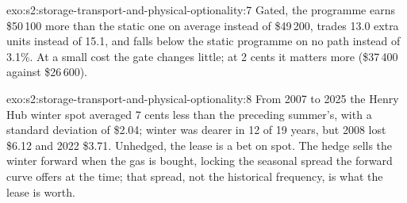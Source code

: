 \begin{solution}{exo:s2:storage-transport-and-physical-optionality:7}
Gated, the programme earns \$50\,100 more than the static one on average instead of \$49\,200, trades 13.0 extra units instead of 15.1, and falls below
the static programme on no path instead of 3.1\%. At a small cost the gate changes little; at 2 cents it matters more (\$37\,400 against \$26\,600).
\end{solution}

\begin{solution}{exo:s2:storage-transport-and-physical-optionality:8}
From 2007 to 2025 the Henry Hub winter spot averaged 7 cents less than the preceding summer's, with a standard deviation of \$2.04; winter was dearer
in 12 of 19 years, but 2008 lost \$6.12 and 2022 \$3.71. Unhedged, the lease is a bet on spot. The hedge sells the winter forward when the gas is
bought, locking the seasonal spread the forward curve offers at the time; that spread, not the historical frequency, is what the lease is worth.
\end{solution}

